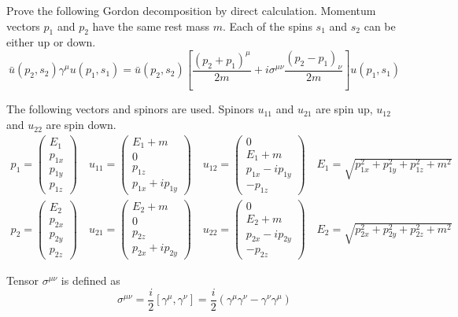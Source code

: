 \documentclass[12pt]{article}
\begin{document}
Prove the following Gordon decomposition by direct calculation.
Momentum vectors $p_1$ and $p_2$ have the same rest mass $m$.
Each of the spins $s_1$ and $s_2$ can be either up or down.
$$
\bar{u}(p_2,s_2)\gamma^\mu u(p_1,s_1)=
\bar{u}(p_2,s_2)
\left[
\frac{(p_2+p_1)^\mu}{2m}+i\sigma^{\mu\nu}\frac{(p_2-p_1)_\nu}{2m}
\right]
u(p_1,s_1)
$$

The following vectors and spinors are used.
Spinors $u_{11}$ and $u_{21}$ are spin up, $u_{12}$ and $u_{22}$ are spin down.
\begin{gather*}
p_1=\begin{pmatrix}E_1\\p_{1x}\\p_{1y}\\p_{1z}\end{pmatrix}\quad
u_{11}=\begin{pmatrix}E_1+m\\0\\p_{1z}\\p_{1x}+ip_{1y}\end{pmatrix}\quad
u_{12}=\begin{pmatrix}0\\E_1+m\\p_{1x}-ip_{1y}\\-p_{1z}\end{pmatrix}\quad
E_1=\sqrt{p_{1x}^2+p_{1y}^2+p_{1z}^2+m^2}\\
p_2=\begin{pmatrix}E_2\\p_{2x}\\p_{2y}\\p_{2z}\end{pmatrix}\quad
u_{21}=\begin{pmatrix}E_2+m\\0\\p_{2z}\\p_{2x}+ip_{2y}\end{pmatrix}\quad
u_{22}=\begin{pmatrix}0\\E_2+m\\p_{2x}-ip_{2y}\\-p_{2z}\end{pmatrix}\quad
E_2=\sqrt{p_{2x}^2+p_{2y}^2+p_{2z}^2+m^2}
\end{gather*}

Tensor $\sigma^{\mu\nu}$ is defined as
$$
\sigma^{\mu\nu}=\frac{i}{2}\left[\gamma^\mu,\gamma^\nu\right]
=\frac{i}{2}\left(\gamma^\mu\gamma^\nu-\gamma^\nu\gamma^\mu\right)
$$
\end{document}

